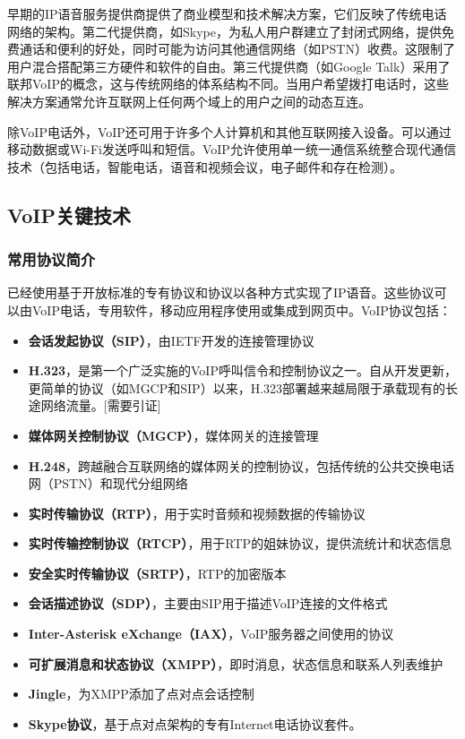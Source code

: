 \documentclass[a4paper,AutoFakeBold,oneside,12pt]{book}
\begin{document}
早期的IP语音服务提供商提供了商业模型和技术解决方案，它们反映了传统电话网络的架构。第二代提供商，如Skype，为私人用户群建立了封闭式网络，提供免费通话和便利的好处，同时可能为访问其他通信网络（如PSTN）收费。这限制了用户混合搭配第三方硬件和软件的自由。第三代提供商（如Google Talk）采用了联邦VoIP的概念，这与传统网络的体系结构不同。当用户希望拨打电话时，这些解决方案通常允许互联网上任何两个域上的用户之间的动态互连。

除VoIP电话外，VoIP还可用于许多个人计算机和其他互联网接入设备。可以通过移动数据或Wi-Fi发送呼叫和短信。VoIP允许使用单一统一通信系统整合现代通信技术（包括电话，智能电话，语音和视频会议，电子邮件和存在检测）。

\subsection{VoIP关键技术}
\subsubsection{常用协议简介}
已经使用基于开放标准的专有协议和协议以各种方式实现了IP语音。这些协议可以由VoIP电话，专用软件，移动应用程序使用或集成到网页中。VoIP协议包括：

\begin{itemize}
\item \textbf{会话发起协议（SIP）}，由IETF开发的连接管理协议
\item \textbf{H.323}，是第一个广泛实施的VoIP呼叫信令和控制协议之一。自从开发更新，更简单的协议（如MGCP和SIP）以来，H.323部署越来越局限于承载现有的长途网络流量。[需要引证]
\item \textbf{媒体网关控制协议（MGCP）}，媒体网关的连接管理
\item \textbf{H.248}，跨越融合互联网络的媒体网关的控制协议，包括传统的公共交换电话网（PSTN）和现代分组网络
\item \textbf{实时传输协议（RTP）}，用于实时音频和视频数据的传输协议
\item \textbf{实时传输控制协议（RTCP）}，用于RTP的姐妹协议，提供流统计和状态信息
\item \textbf{安全实时传输协议（SRTP）}，RTP的加密版本
\item \textbf{会话描述协议（SDP）}，主要由SIP用于描述VoIP连接的文件格式
\item \textbf{Inter-Asterisk eXchange（IAX）}，VoIP服务器之间使用的协议
\item \textbf{可扩展消息和状态协议（XMPP）}，即时消息，状态信息和联系人列表维护
\item \textbf{Jingle}，为XMPP添加了点对点会话控制
\item \textbf{Skype协议}，基于点对点架构的专有Internet电话协议套件。
\end{itemize}
\end{document}

